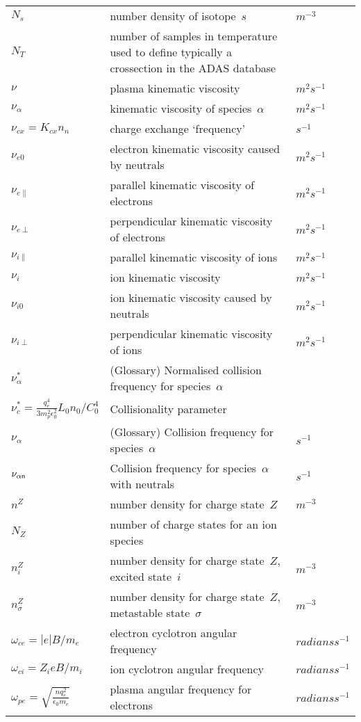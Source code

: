 \begin{longtable}{|p{3.0cm}|p{10.0cm}|p{3.0cm}|}
$N_s$ & number density of isotope~$s$ & $m^{-3}$ \\
$N_T$ & number of samples in temperature used to define typically a crossection in the ADAS database~\cite{adaswebsite,openadaswebsite} & \\
$\nu$ & plasma kinematic viscosity & $m^2 s^{-1}$ \\
$\nu_\alpha$ & kinematic viscosity of species~$\alpha$ & $m^2 s^{-1}$ \\
$\nu_{cx}=K_{cx} n_n$ & charge exchange `frequency'  & $s^{-1}$ \\
$\nu_{e0}$ & electron kinematic viscosity caused by neutrals & $m^2 s^{-1}$ \\
$\nu_{e\|}$ & parallel kinematic viscosity of electrons & $m^2 s^{-1}$ \\
$\nu_{e\perp}$ & perpendicular kinematic viscosity of electrons & $m^2 s^{-1}$ \\
$\nu_{i\|}$ & parallel kinematic viscosity of ions & $m^2 s^{-1}$ \\
$\nu_i$ & ion kinematic viscosity & $m^2 s^{-1}$ \\
$\nu_{i0}$ & ion kinematic viscosity caused by neutrals & $m^2 s^{-1}$ \\
$\nu_{i\perp}$ & perpendicular kinematic viscosity of ions & $m^2 s^{-1}$ \\
$\nu^{*}_\alpha$ & (Glossary) Normalised collision frequency for species~$\alpha$ & \\
$\nu^{*}_c = \frac{q_e^4}{3 m_p^2\epsilon_0^2} L_0 n_0 /C_0^4$ & Collisionality parameter & \\
$\nu_\alpha$ & (Glossary) Collision frequency for species~$\alpha$ & $s^{-1}$ \\
$\nu_{\alpha{\sf n}}$ & Collision frequency for species~$\alpha$ with neutrals & $s^{-1}$ \\
$n^Z$ & number density for charge state~$Z$  & $m^{-3}$ \\
$N_Z$ & number of charge states for an ion species & \\
$n^Z_i$ & number density for charge state~$Z$, excited state~$i$  & $m^{-3}$ \\
$n^Z_\sigma$ & number density for charge state~$Z$, metastable state~$\sigma$  & $m^{-3}$ \\
$\omega_{ce}= |e|B/m_e$ & electron cyclotron angular frequency & $radians s^{-1}$ \\
$\omega_{ci}= Z_i e B/m_i$ & ion cyclotron angular frequency & $radians s^{-1}$ \\
$\omega_{pe}= \sqrt{\frac{nq_e^2}{\epsilon_0 m_e}}$ & plasma angular frequency for electrons & $radians s^{-1}$ \\

\end{longtable}
